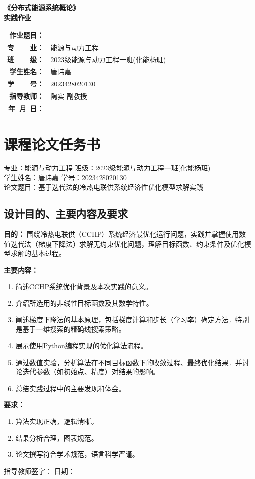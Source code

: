 \documentclass[12pt]{article} %
\newcommand{\cover}[6]{
  \begin{center}
    \vspace*{2cm} 
    {\Huge \bfseries 《分布式能源系统概论》}\\[2em] 
    {\LARGE \bfseries 实践作业}\\[3em] 
    
    \begin{tabular}{rl} 
      \bfseries 作业题目： & \underline{\makebox[10cm][s]{#1}} \\[1.5em] 
      \bfseries 专~~~~业： & 能源与动力工程 \\[1.5em]
      \bfseries 班~~~~级： & 2023级能源与动力工程一班(化能杨班) \\[1.5em]
      \bfseries 学生姓名： & 唐玮嘉 \\[1.5em]
      \bfseries 学~~~~号： & 2023428020130 \\[1.5em]
      \bfseries 指导教师： & 陶实 副教授 \\[1.5em]
      \bfseries 年~月~日： & \underline{\makebox[6cm][s]{#2}} \\ 
    \end{tabular}
    \vspace*{3cm} 
  \end{center}
}
\begin{document}
\pagestyle{empty} 

\cover{基于迭代法的冷热电联供系统经济性优化模型求解实践}{\today}{}{}{}{}
\newpage


\section*{课程论文任务书 }
\noindent 专业：能源与动力工程 \quad 班级：2023级能源与动力工程一班(化能杨班) \\
学生姓名：唐玮嘉 \quad 学号：2023428020130 \\
论文题目：基于迭代法的冷热电联供系统经济性优化模型求解实践

\subsection*{设计目的、主要内容及要求}
\textbf{目的：} 围绕冷热电联供（CCHP）系统经济最优化运行问题，实践并掌握使用数值迭代法（梯度下降法）求解无约束优化问题，理解目标函数、约束条件及优化模型求解的基本过程。

\textbf{主要内容：}
\begin{enumerate}
    \item 简述CCHP系统优化背景及本次实践的意义。
    \item 介绍所选用的非线性目标函数及其数学特性。
    \item 阐述梯度下降法的基本原理，包括梯度计算和步长（学习率）确定方法，特别是基于一维搜索的精确线搜索策略。
    \item 展示使用Python编程实现的优化算法流程。
    \item 通过数值实验，分析算法在不同目标函数下的收敛过程、最终优化结果，并讨论迭代参数（如初始点、精度）对结果的影响。
    \item 总结实践过程中的主要发现和体会。
\end{enumerate}

\textbf{要求：}
\begin{enumerate}
    \item 算法实现正确，逻辑清晰。
    \item 结果分析合理，图表规范。
    \item 论文撰写符合学术规范，语言科学严谨。
\end{enumerate}
\vspace{1cm}
\noindent 指导教师签字：\underline{\makebox[6cm][s]{}} \hspace{2cm} 日期：\underline{\makebox[4cm][s]{}}
\end{document}
